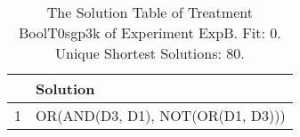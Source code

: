 \begin{table}[ht]
\centering
\begin{tabular}{rp{9cm}}
  \hline
 & Solution \\ 
  \hline
1 & OR(AND(D3, D1), NOT(OR(D1, D3))) \\ 
   \hline
\end{tabular}
\caption{The Solution Table of Treatment BoolT0sgp3k of Experiment ExpB. Fit: 0. Unique Shortest Solutions: 80.} 
\end{table}
